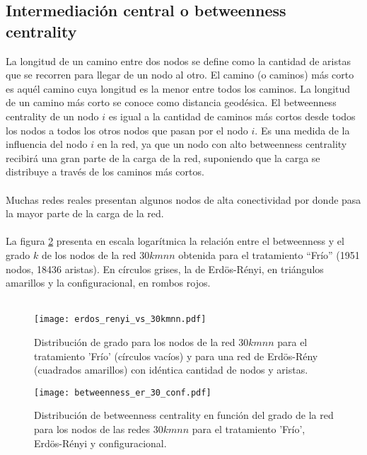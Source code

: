\subsection*{Intermediación central o betweenness centrality}
La longitud de un camino entre dos nodos se define como la cantidad de aristas que se recorren para llegar de un nodo al otro. El camino (o caminos) más corto es aquél camino cuya longitud es la menor entre todos los caminos. La longitud de un camino más corto se conoce como distancia geodésica. El betweenness centrality de un nodo $i$ es igual a la cantidad de caminos más cortos desde todos los nodos a todos los otros nodos que pasan por el nodo $i$. Es una medida de la influencia del nodo $i$ en la red, ya que un nodo con alto betweenness centrality recibirá una gran parte de la carga de la red, suponiendo que la carga se distribuye a través de los caminos más cortos.\\\\
Muchas redes reales presentan algunos nodos de alta conectividad por donde pasa la mayor parte de la carga de la red.\\\\
La figura \ref{fig:betweenness_er_30_conf} presenta en escala logarítmica la relación entre el betweenness y el grado $k$ de los nodos de la red $30kmnn$ obtenida para el tratamiento ``Frío'' (1951 nodos, 18436 aristas). En círculos grises, la de Erdös-Rényi, en triángulos amarillos y la configuracional, en rombos rojos.\\\\
\begin{sidewaysfigure}[H]
    \centering
    \begin{subfigure}[t]{0.45\textwidth}
    \centering
    \texttt{[image: erdos\_renyi\_vs\_30kmnn.pdf]}
    \caption{Distribución de grado para los nodos de la red $30kmnn$ para el tratamiento 'Frío' (círculos vacíos) y para una red de Erdös-Rény (cuadrados amarillos) con idéntica cantidad de nodos y aristas.}
    \label{fig:erdos_renyi_vs_30kmnn}
    \end{subfigure}    
    \centering
    \begin{subfigure}[t]{0.45\textwidth}
    \centering
    \texttt{[image: betweenness\_er\_30\_conf.pdf]}
    \caption{Distribución de betweenness centrality en función del grado de la red para los nodos de las redes $30kmnn$ para el tratamiento 'Frío', Erdös-Rényi y configuracional.}
    \label{fig:betweenness_er_30_conf}
    \end{subfigure}        
    \caption{Distribución de grado y de betweenness centrality para los nodos de la red $30kmnn$ y modelos nulos para el tratamiento 'Frío'.}
\end{sidewaysfigure}
